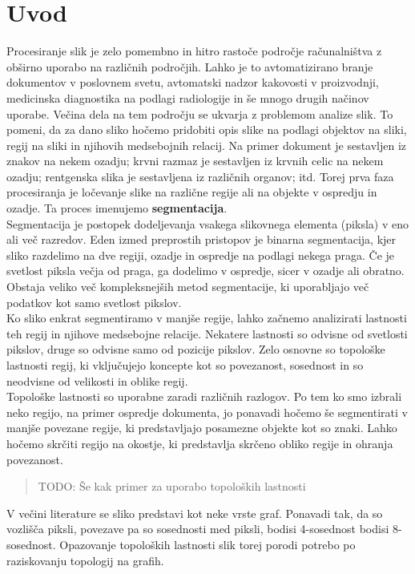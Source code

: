 \documentclass[a4paper, 12pt]{book}
\theoremstyle{definition}
\begin{document}
\chapter{Uvod}
Procesiranje slik je zelo pomembno in hitro rastoče področje računalništva z 
obširno uporabo na različnih področjih. Lahko je to avtomatizirano branje dokumentov
v poslovnem svetu, avtomatski nadzor kakovosti v proizvodnji, medicinska diagnostika
na podlagi radiologije in še mnogo drugih načinov uporabe. Večina dela na tem področju
se ukvarja z problemom analize slik. To pomeni, da za dano sliko hočemo pridobiti
opis slike na podlagi objektov na sliki, regij na sliki in njihovih medsebojnih relacij.
Na primer dokument je sestavljen iz znakov na nekem ozadju; krvni razmaz je 
sestavljen iz krvnih celic na nekem ozadju; rentgenska slika je sestavljena
iz različnih organov; itd. Torej prva faza procesiranja je ločevanje slike na
različne regije ali na objekte v ospredju in ozadje. Ta proces imenujemo \textbf{segmentacija}.\\
Segmentacija je postopek dodeljevanja vsakega slikovnega elementa (piksla) v eno ali več
razredov. Eden izmed preprostih pristopov je binarna segmentacija, kjer sliko razdelimo
na dve regiji, ozadje in ospredje na podlagi nekega praga. Če je svetlost piksla večja
od praga, ga dodelimo v ospredje, sicer v ozadje ali obratno. Obstaja veliko več
kompleksnejših metod segmentacije, ki uporabljajo več podatkov kot samo svetlost
pikslov.\\
Ko sliko enkrat segmentiramo v manjše regije, lahko začnemo analizirati lastnosti
teh regij in njihove medsebojne relacije. Nekatere lastnosti so odvisne od svetlosti
pikslov, druge so odvisne samo od pozicije pikslov. Zelo osnovne so topološke lastnosti
regij, ki vključujejo koncepte kot so povezanost, sosednost in so neodvisne od
velikosti in oblike regij.\\
Topološke lastnosti so uporabne zaradi različnih razlogov. Po tem ko smo izbrali
neko regijo, na primer ospredje dokumenta, jo ponavadi hočemo še segmentirati v
manjše povezane regije, ki predstavljajo posamezne objekte kot so znaki. Lahko
hočemo skrčiti regijo na okostje, ki predstavlja skrčeno obliko regije in ohranja
povezanost.
\begin{quote}
    TODO: Še kak primer za uporabo topoloških lastnosti
\end{quote}
V večini literature se sliko predstavi kot neke vrste graf. Ponavadi tak, da
so vozlišča piksli, povezave pa so sosednosti med piksli, bodisi 4-sosednost
bodisi 8-sosednost. Opazovanje topoloških lastnosti slik torej porodi potrebo po
raziskovanju topologij na grafih. 
\end{document}
